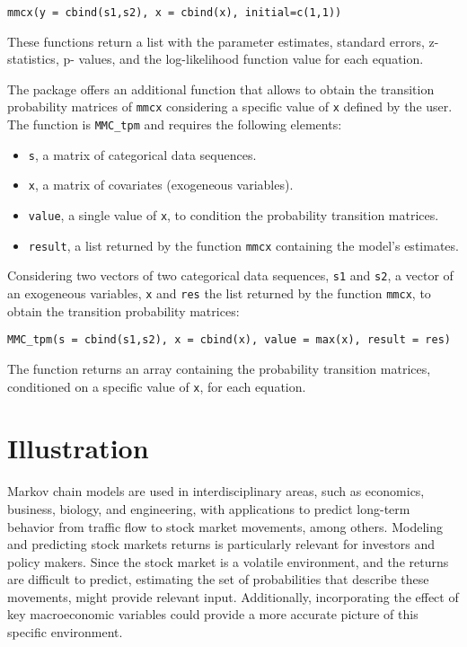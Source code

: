 \begin{verbatim}
mmcx(y = cbind(s1,s2), x = cbind(x), initial=c(1,1))
\end{verbatim}

These functions return a list with the parameter estimates, standard errors, z-statistics, p- values, and the log-likelihood function value for each equation.

The package offers an additional function that allows to obtain the transition probability matrices of \texttt{mmcx} considering a specific value of \texttt{x} defined by the user. The function is \texttt{MMC\_tpm} and requires the following elements:

\begin{itemize}
\tightlist
\item
  \texttt{s}, a matrix of categorical data sequences.
\item
  \texttt{x}, a matrix of covariates (exogeneous variables).
\item
  \texttt{value}, a single value of \texttt{x}, to condition the probability transition matrices.
\item
  \texttt{result}, a list returned by the function \texttt{mmcx} containing the model's estimates.
\end{itemize}

Considering two vectors of two categorical data sequences, \texttt{s1} and \texttt{s2}, a vector of an exogeneous variables, \texttt{x} and \texttt{res} the list returned by the function \texttt{mmcx}, to obtain the transition probability matrices:

\begin{verbatim}
MMC_tpm(s = cbind(s1,s2), x = cbind(x), value = max(x), result = res)
\end{verbatim}

The function returns an array containing the probability transition matrices, conditioned on a specific value of \texttt{x}, for each equation.

\hypertarget{illustration}{%
\section{Illustration}\label{illustration}}

Markov chain models are used in interdisciplinary areas, such as economics, business, biology, and engineering, with applications to predict long-term behavior from traffic flow to stock market movements, among others. Modeling and predicting stock markets returns is particularly relevant for investors and policy makers. Since the stock market is a volatile environment, and the returns are difficult to predict, estimating the set of probabilities that describe these movements, might provide relevant input. Additionally, incorporating the effect of key macroeconomic variables could provide a more accurate picture of this specific environment.


